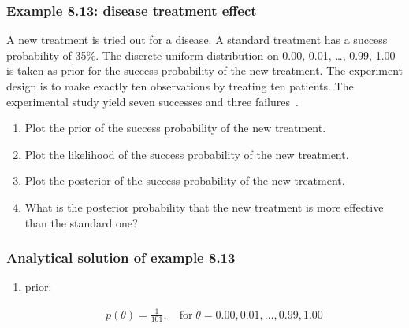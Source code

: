 \begin{frame}
    \frametitle{Example 8.13: disease treatment effect}

	\small
    \begin{manualProbExample}{8.13}

        A new treatment is tried out for a disease. A standard treatment has a
        success probability of 35\%. The discrete uniform distribution on 0.00,
        0.01, \ldots, 0.99, 1.00 is taken as prior for the success probability
        of the new treatment. The experiment design is to make exactly ten
        observations by treating ten patients. The experimental study yield
        seven successes and three failures~\citep{berry06}.

		\begin{enumerate}[a]

			\item Plot the prior of the success probability of the new treatment.
			\item Plot the likelihood of the success probability of the new treatment.
			\item Plot the posterior of the success probability of the new treatment.
			\item What is the posterior probability that the new treatment is
			more effective than the standard one?

		\end{enumerate}

    \end{manualProbExample}
	\normalsize

\end{frame}

\begin{frame}
    \frametitle{Analytical solution of example 8.13}

    \scriptsize
	\begin{enumerate}[a]

		\item prior:

			\begin{align*}
				p(\theta) = \frac{1}{101},\quad\text{for}\;\theta=0.00,0.01,\ldots,0.99,1.00
			\end{align*}
            \seti
	\end{enumerate}

\end{frame}

